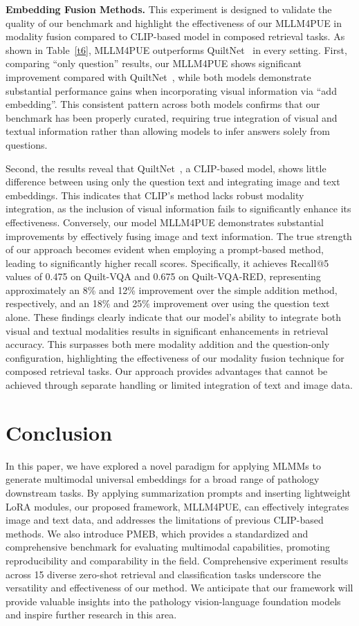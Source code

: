 \noindent
\textbf{Embedding Fusion Methods.} This experiment is designed to validate the quality of our benchmark and highlight the effectiveness of our MLLM4PUE in modality fusion compared to CLIP-based model in composed retrieval tasks. As shown in Table~\ref{t6}, MLLM4PUE outperforms QuiltNet~\cite{ikezogwo2024quilt} in every setting. First, comparing ``only question'' results, our MLLM4PUE shows significant improvement compared with QuiltNet~\cite{ikezogwo2024quilt}, while both models demonstrate substantial performance gains when incorporating visual information via ``add embedding''. This consistent pattern across both models confirms that our benchmark has been properly curated, requiring true integration of visual and textual information rather than allowing models to infer answers solely from questions. 

Second, the results reveal that QuiltNet~\cite{ikezogwo2024quilt}, a CLIP-based model, shows little difference between using only the question text and integrating image and text embeddings. This indicates that CLIP's method lacks robust modality integration, as the inclusion of visual information fails to significantly enhance its effectiveness. Conversely, our model MLLM4PUE demonstrates substantial improvements by effectively fusing image and text information.  The true strength of our approach becomes evident when employing a prompt-based method, leading to significantly higher recall scores. Specifically, it achieves Recall@5 values of 0.475 on Quilt-VQA and 0.675 on Quilt-VQA-RED, representing approximately an 8\% and 12\% improvement over the simple addition method, respectively, and an 18\% and 25\% improvement over using the question text alone. These findings clearly indicate that our model's ability to integrate both visual and textual modalities results in significant enhancements in retrieval accuracy. This surpasses both mere modality addition and the question-only configuration, highlighting the effectiveness of our modality fusion technique for composed retrieval tasks. Our approach provides advantages that cannot be achieved through separate handling or limited integration of text and image data.

\section{Conclusion}
In this paper, we have explored a novel paradigm for applying MLMMs to generate multimodal universal embeddings for a broad range of pathology downstream tasks. By applying summarization prompts and inserting lightweight LoRA modules, our proposed framework, MLLM4PUE, can effectively integrates image and text data, and addresses the limitations of previous CLIP-based methods. We also introduce PMEB, which provides a standardized and comprehensive benchmark for evaluating multimodal capabilities, promoting reproducibility and comparability in the field. Comprehensive experiment results across 15 diverse zero-shot retrieval and classification tasks underscore the versatility and effectiveness of our method. We anticipate that our framework will provide valuable insights into the pathology vision-language foundation models and inspire further research in this area.